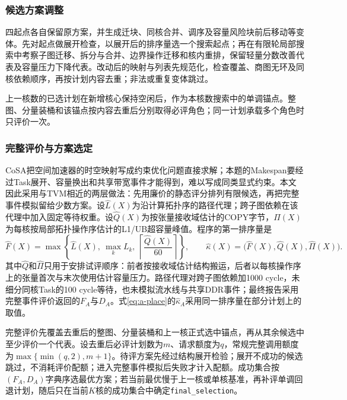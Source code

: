 \subsubsection{候选方案调整}
四起点各自保留原方案，并生成迁块、同核合并、调序及容量风险块前后移动等变体。先对起点做展开检查，以展开后的排序量选一个搜索起点；再在有限轮局部搜索中考察子图迁移、拆分与合并、边界操作迁移和核内重排，保留轻量分数改善代表及容量压力下降代表。改动后的映射与列表先规范化，检查覆盖、商图无环及同核依赖顺序，再按计划内容去重；非法或重复变体跳过。

上一核数的已选计划在新增核心保持空闲后，作为本核数搜索中的单调锚点。整图、分量装桶和该锚点按内容去重后分别取得必评角色；同一计划承载多个角色时只评价一次。

\subsubsection{完整评价与方案选定}
CoSA把空间加速器的时空映射写成约束优化问题直接求解\cite{huang2021cosa}；本题的Makespan要经过Task展开、容量换出和共享带宽事件才能得到，难以写成同类显式约束。本文因此采用与TVM相近的两层做法\cite{chen2018tvm}：先用廉价的静态评分排列有限候选，再把完整事件模拟留给少数方案。设$\widehat L(X)$为沿计算拓扑序的路径代理；跨子图依赖在该代理中加入固定等待权重。设$\widehat Q(X)$为按张量接收域估计的COPY字节，$\widehat\Pi(X)$为每核按局部拓扑操作序估计的L1/UB超容量峰值。程序的第一排序量是
\begin{equation}
\widehat F(X)=\max\left\{\widehat L(X),\ \max_k L_k,\
\left\lceil\frac{\widehat Q(X)}{60}\right\rceil\right\},\qquad
\widehat\kappa(X)=\bigl(\widehat F(X),\widehat Q(X),\widehat\Pi(X)\bigr).
\label{eq:a-light-score}
\end{equation}
其中$\widehat Q$和$\widehat\Pi$只用于安排试评顺序：前者按接收域估计结构搬运，后者以每核操作序上的张量首次与末次使用估计容量压力。路径代理对跨子图依赖加1000 cycle，未细分同核Task的100 cycle等待，也未模拟流水线与共享DDR事件；最终报告采用完整事件评价返回的$F_A$与$D_A$。式\eqref{eq:a-place}的$\widehat\kappa_A$采用同一排序量在部分计划上的取值。

完整评价先覆盖去重后的整图、分量装桶和上一核正式选中锚点，再从其余候选中至少评价一个代表。设去重后必评计划数为$m$、请求额度为$q$，常规完整调用额度为$\max\{\min(q,2),m+1\}$。待评方案先经过结构展开检验；展开不成功的候选跳过，不消耗评价配额；进入完整事件模拟后失败才计入配额。成功集合按$(F_A,D_A)$字典序选最优方案；若当前最优慢于上一核或单核基准，再补评单调回退计划，随后只在当前$K$核的成功集合中确定\texttt{final\_selection}。

